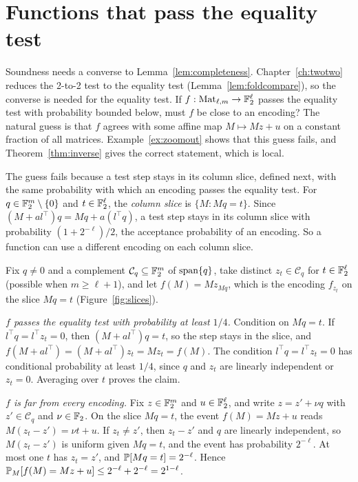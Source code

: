 \chapter{Functions that pass the equality test}\label{ch:soundness}

Soundness needs a converse to Lemma~\ref{lem:completeness}. Chapter~\ref{ch:twotwo} reduces the 2-to-2 test to the equality test (Lemma~\ref{lem:foldcompare}), so the converse is needed for the equality test. If $f:\operatorname{Mat}_{\ell,m}\to\mathbb{F}_2^\ell$ passes the equality test with probability bounded below, must $f$ be close to an encoding? The natural guess is that $f$ agrees with some affine map $M\mapsto Mz+u$ on a constant fraction of all matrices. Example~\ref{ex:zoomout} shows that this guess fails, and Theorem~\ref{thm:inverse} gives the correct statement, which is local.

The guess fails because a test step stays in its column slice, defined next, with the same probability with which an encoding passes the equality test. For $q\in\mathbb{F}_2^m\setminus\{0\}$ and $t\in\mathbb{F}_2^\ell$, the \emph{column slice} is $\{M:Mq=t\}$. Since $(M+al^\top)q=Mq+a(l^\top q)$, a test step stays in its column slice with probability $(1+2^{-\ell})/2$, the acceptance probability of an encoding. So a function can use a different encoding on each column slice.

\begin{example}\label{ex:zoomout}
Fix $q\ne0$ and a complement $\mathcal C_q\subseteq\mathbb{F}_2^m$ of $\operatorname{span}\{q\}$, take distinct $z_t\in\mathcal C_q$ for $t\in\mathbb{F}_2^\ell$ (possible when $m\ge\ell+1$), and let $f(M)=Mz_{Mq}$, which is the encoding $f_{z_t}$ on the slice $Mq=t$ (Figure~\ref{fig:slices}).

\emph{$f$ passes the equality test with probability at least $1/4$.} Condition on $Mq=t$. If $l^\top q=l^\top z_t=0$, then $(M+al^\top)q=t$, so the step stays in the slice, and $f(M+al^\top)=(M+al^\top)z_t=Mz_t=f(M)$. The condition $l^\top q=l^\top z_t=0$ has conditional probability at least $1/4$, since $q$ and $z_t$ are linearly independent or $z_t=0$. Averaging over $t$ proves the claim.

\emph{$f$ is far from every encoding.} Fix $z\in\mathbb{F}_2^m$ and $u\in\mathbb{F}_2^\ell$, and write $z=z'+\nu q$ with $z'\in\mathcal C_q$ and $\nu\in\mathbb{F}_2$. On the slice $Mq=t$, the event $f(M)=Mz+u$ reads $M(z_t-z')=\nu t+u$. If $z_t\ne z'$, then $z_t-z'$ and $q$ are linearly independent, so $M(z_t-z')$ is uniform given $Mq=t$, and the event has probability $2^{-\ell}$. At most one $t$ has $z_t=z'$, and $\mathbb{P}[Mq=t]=2^{-\ell}$. Hence $\mathbb{P}_M[f(M)=Mz+u]\le2^{-\ell}+2^{-\ell}=2^{1-\ell}$.
\end{example}

